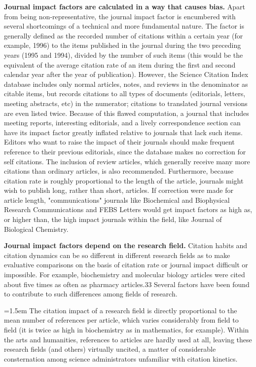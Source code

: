 \documentclass[11pt, a4paper]{article}
\renewcommand{\emph}[1]{\textbf{#1}}
\begin{document}
\parindent=0pt \parskip=10pt
\emph{Journal impact factors are calculated in a way that causes bias.}
Apart from being non-representative, the journal impact factor is encumbered with several
shortcomings of a technical and more fundamental nature. The factor is generally defined as
the recorded number of citations within a certain year (for example, 1996) to the items
published in the journal during the two preceding years (1995 and 1994), divided by the
number of such items (this would be the equivalent of the average citation rate of an item
during the first and second calendar year after the year of publication). However, the
Science Citation Index database includes only normal articles, notes, and reviews in the
denominator as citable items, but records citations to all types of documents
(editorials, letters, meeting abstracts, etc) in the numerator; citations to translated
journal versions are even listed twice. Because of this flawed computation, a journal that
includes meeting reports, interesting editorials, and a lively correspondence section
can have its impact factor greatly inflated relative to journals that lack such items.
Editors who want to raise the impact of their journals should make frequent reference to their
previous editorials, since the database makes no correction for self citations.
The inclusion of review articles, which generally receive many more citations than ordinary articles,
is also recommended. Furthermore, because citation rate is roughly proportional to the length of
the article, journals might wish to publish long, rather than short, articles.
If correction were made for article length, "communications" journals like Biochemical and
Biophysical Research Communications and FEBS Letters would get impact factors as high as,
or higher than, the high impact journals within the field, like Journal of Biological Chemistry.

\emph{Journal impact factors depend on the research field.}
Citation habits and citation dynamics can be so different in different research fields as to
make evaluative comparisons on the basis of citation rate or journal impact difficult or
impossible. For example, biochemistry and molecular biology articles were cited about five
times as often as pharmacy articles.33 Several factors have been found to contribute to such
differences among fields of research.

\parindent=1.5em \parskip=0pt
The citation impact of a research field is directly proportional to the mean number of
references per article, which varies considerably from field to field (it is twice as high
in biochemistry as in mathematics, for example). Within the arts and humanities, references
to articles are hardly used at all, leaving these research fields (and others) virtually uncited,
a matter of considerable consternation among science administrators unfamiliar with citation kinetics.
\end{document}
